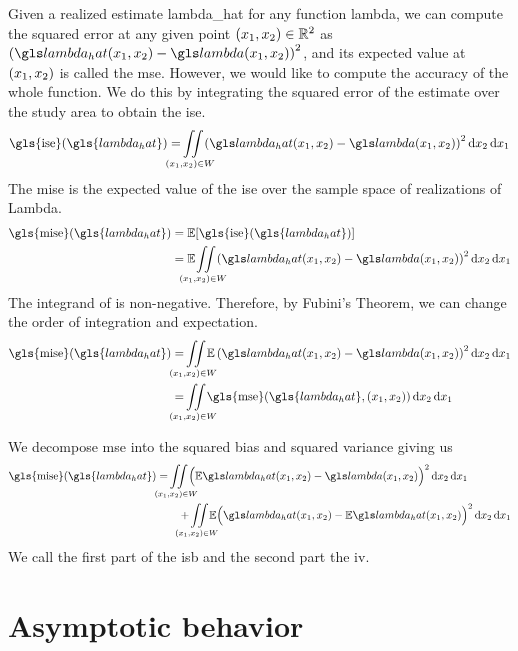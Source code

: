 Given a realized estimate \gls{lambda_hat} for any function \gls{lambda},
we can compute the squared error at any given point $(x_1, x_2) \in \mathbb{R}^2$ as
$\left( \lmbdhat - \lmbd \right)^2$,
and its expected value at $(x_1, x_2)$ is called the \gls{mse}.
However,
we would like to compute the accuracy of the whole function.
We do this by integrating the squared error of the estimate over the study area to obtain the \gls{ise}.
\begin{equation}
\label{eq:ise}
    \mbox{\gls{ise}}(\gls{lambda_hat}) = \iintW{
            \left( \lmbdhat - \lmbd \right)^2
    }
\end{equation}
The \gls{mise} is the expected value of the \gls{ise} over the sample space of realizations of \gls{Lambda}.
\begin{align}
    \mbox{\gls{mise}}(\gls{lambda_hat}) 
        & = \E [\mbox{\gls{ise}}(\gls{lambda_hat})] \nonumber \\
        & = \E \iintW{ \left( \lmbdhat - \lmbd \right)^2 } \label{eq:mise}
\end{align}
The integrand of  is non-negative.
Therefore, by Fubini's Theorem, we can change the order of integration and expectation.
\begin{align}
    \mbox{\gls{mise}}(\gls{lambda_hat}) 
        & = \iintW{ \E \left( \lmbdhat - \lmbd \right)^2 } \nonumber \\
        & = \iintW{ \mbox{\gls{mse}}(\gls{lambda_hat}, \xvec) } \nonumber
\end{align}

We decompose \gls{mse} into the squared bias and squared variance%
giving us
\begin{align}
    \mbox{\gls{mise}}(\gls{lambda_hat}) 
        & = \iintW{ \Big( \E\lmbdhat - \lmbd \Big)^2 } \nonumber \\
        & \qquad + \iintW{ \E \Big( \lmbdhat - \E\lmbdhat \Big)^2 } \label{eq:mise:intbiasvariance}
\end{align}
We call the first part of  the \gls{isb} and the second part the \gls{iv}.

\section{Asymptotic behavior}
\label{sec:theory:asymptotic_bandwidth}

